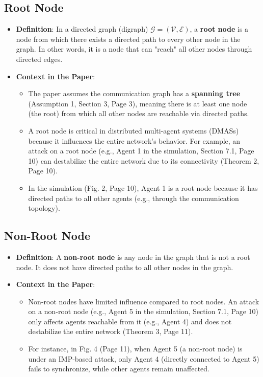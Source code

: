 \documentclass{article}
\begin{document}
\subsection{Root Node}
\begin{itemize}
    \item \textbf{Definition}: In a directed graph (digraph) $\mathcal{G} = (\mathcal{V}, \mathcal{E})$, a \textbf{root node} is a node from which there exists a directed path to every other node in the graph. In other words, it is a node that can "reach" all other nodes through directed edges.
    
    \item \textbf{Context in the Paper}:
    \begin{itemize}
        \item The paper assumes the communication graph has a \textbf{spanning tree} (Assumption 1, Section 3, Page 3), meaning there is at least one node (the root) from which all other nodes are reachable via directed paths.
        \item A root node is critical in distributed multi-agent systems (DMASs) because it influences the entire network's behavior. For example, an attack on a root node (e.g., Agent 1 in the simulation, Section 7.1, Page 10) can destabilize the entire network due to its connectivity (Theorem 2, Page 10).
        \item In the simulation (Fig. 2, Page 10), Agent 1 is a root node because it has directed paths to all other agents (e.g., through the communication topology).
    \end{itemize}
\end{itemize}

\subsection{Non-Root Node}
\begin{itemize}
    \item \textbf{Definition}: A \textbf{non-root node} is any node in the graph that is not a root node. It does not have directed paths to all other nodes in the graph.
    
    \item \textbf{Context in the Paper}:
    \begin{itemize}
        \item Non-root nodes have limited influence compared to root nodes. An attack on a non-root node (e.g., Agent 5 in the simulation, Section 7.1, Page 10) only affects agents reachable from it (e.g., Agent 4) and does not destabilize the entire network (Theorem 3, Page 11).
        \item For instance, in Fig. 4 (Page 11), when Agent 5 (a non-root node) is under an IMP-based attack, only Agent 4 (directly connected to Agent 5) fails to synchronize, while other agents remain unaffected.
    \end{itemize}
\end{itemize}
\end{document}
